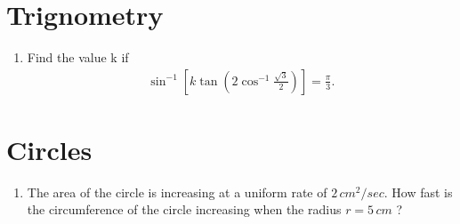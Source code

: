 \documentclass[12pt,-letter paper]{article}
\begin{document}
\section {Trignometry}
\begin {enumerate}
\item Find the value k if \\            
	\begin {align*} 
	\sin^{-1} \left[k \tan \left( 2\cos^{-1} \frac {\sqrt{3}}{2}\right)\right]= \frac{\pi}{3}.
		\end {align*}

\end {enumerate}

\section{Circles}
\begin {enumerate}
\item The area of the circle is increasing at a uniform rate of $2\,cm^2/sec$. How fast is the circumference of the circle increasing when the radius $r = 5\,cm$ ?
\end {enumerate}
	
\end{document}
